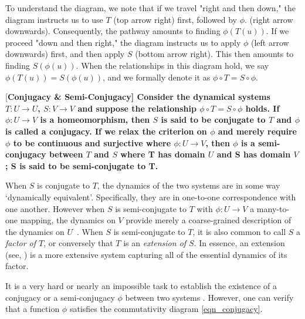 To understand the diagram, we note that if we travel "right and then down," the diagram instructs us to use $T$ (top arrow right) first, followed by $\phi$. (right arrow downwards). Consequently, the pathway amounts to finding $\phi(T(u))$. If we proceed "down and then right," the diagram instructs us to apply $\phi$ (left arrow downwards) first, and then apply $S$ (bottom arrow right). This then amounts to finding  $S(\phi(u))$. When the relationships in this diagram hold, we say $\phi(T(u))= S(\phi(u))$, and we formally denote it as $\phi \circ T=S\circ \phi$.

\begin{Definition}\rm  
[\bf {Conjugacy \& Semi-Conjugacy}]\label{Dfn_Conjugate}\rm
   Consider the dynamical systems $T:U\to{U}$, $S:V\to{V}$ and suppose the relationship $\phi \circ T=S\circ \phi$ holds. If $\phi:U\to{V}$ is a homeomorphism, then $S$ is said to be conjugate to $T$ and $\phi$ is called a conjugacy. If we relax the criterion on $\phi$ and merely require $\phi$ to be continuous and surjective where $\phi:U\to{V}$, then $\phi$ is a semi-conjugacy between $T$ and $S$ where T has domain $U$ and S has domain $V$; S is said to be semi-conjugate to T. 
\end{Definition} 

When $S$ is conjugate to $T$, the dynamics of the two systems are in some way `dynamically equivalent'. Specifically, they are in one-to-one correspondence with one another. However when $S$ is semi-conjugate to $T$ with $\phi:U\to{V}$ a many-to-one mapping, the dynamics on $V$ provide merely a coarse-grained description of the dynamics on $U$~\cite{de2013elements}. When $S$ is semi-conjugate to $T$, it is also common to call $S$ a \emph{factor of $T$}, or conversely that $T$ is an \emph{extension of $S$}. In essence, an extension (see, \cite{de2013elements}) is a more extensive system capturing all of the essential dynamics of its factor.

It is a very hard or nearly an impossible task to establish the existence of a conjugacy or a semi-conjugacy $\phi$ between two systems \cite{devaney2018introduction}. However, one can verify that a function $\phi$ satisfies the commutativity diagram \ref{eqn_conjugacy}.  

